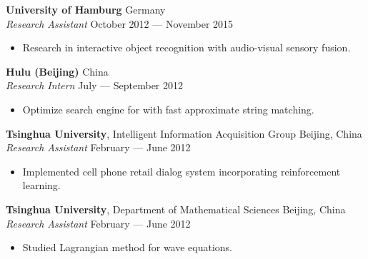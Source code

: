 \documentclass[a4paper,9pt]{extarticle} %
\begin{document}

\textbf{University of Hamburg} \hfill Germany \\
\textit{Research Assistant}  \hfill October 2012 --- November 2015%
\vspace{-.9\parskip}
\begin{itemize}
  \item Research in interactive object recognition with audio-visual sensory fusion.
\end{itemize}


\textbf{Hulu (Beijing)} \hfill China \\
\textit{Research Intern} \hfill July --- September 2012%
\vspace{-.9\parskip}
\begin{itemize}
  \item Optimize search engine for with fast approximate string matching.
\end{itemize}


\iffalse{}

\textbf{Tsinghua University}, Intelligent Information Acquisition Group \hfill Beijing, China \\
\textit{Research Assistant} \hfill February --- June 2012
\vspace{-\parskip}
\begin{itemize}
  \item Implemented cell phone retail dialog system incorporating reinforcement learning.
\end{itemize}


\textbf{Tsinghua University}, Department of Mathematical Sciences \hfill Beijing, China \\
\textit{Research Assistant} \hfill February --- June 2012
\vspace{-\parskip}
\begin{itemize}
  \item Studied Lagrangian method for wave equations.
\end{itemize}
\end{document}
